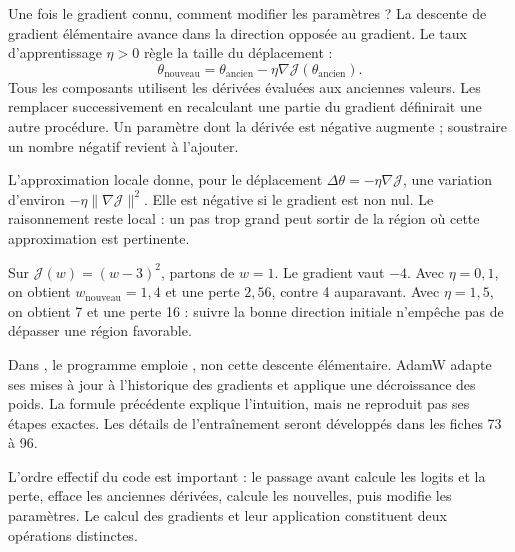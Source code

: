 

Une fois le gradient connu, comment modifier les paramètres ?
La descente de gradient élémentaire avance dans la direction
opposée au gradient. Le taux d'apprentissage \(\eta>0\)
règle la taille du déplacement :
\[
 \theta_{\mathrm{nouveau}}
 =\theta_{\mathrm{ancien}}-\eta\nabla\mathcal{J}
   (\theta_{\mathrm{ancien}}).
\]
Tous les composants utilisent les dérivées évaluées aux anciennes
valeurs. Les remplacer successivement en recalculant une partie
du gradient définirait une autre procédure.
Un paramètre dont la dérivée est négative augmente ; soustraire
un nombre négatif revient à l'ajouter.

L'approximation locale donne, pour le déplacement
\(\Delta\theta=-\eta\nabla\mathcal{J}\),
une variation d'environ
\(-\eta\|\nabla\mathcal{J}\|^2\).
Elle est négative si le gradient est non nul.
Le raisonnement reste local : un pas trop grand peut sortir
de la région où cette approximation est pertinente.

Sur \(\mathcal{J}(w)=(w-3)^2\), partons de \(w=1\).
Le gradient vaut \(-4\). Avec \(\eta=0{,}1\), on obtient
\(w_{\mathrm{nouveau}}=1{,}4\) et une perte \(2{,}56\),
contre 4 auparavant. Avec \(\eta=1{,}5\), on obtient 7
et une perte 16 : suivre la bonne direction initiale
n'empêche pas de dépasser une région favorable.

Dans , le programme emploie
, non cette descente élémentaire.
AdamW adapte ses mises à jour à l'historique des gradients
et applique une décroissance des poids. La formule précédente
explique l'intuition, mais ne reproduit pas ses étapes exactes.
Les détails de l'entraînement seront développés dans les
fiches 73 à 96.

L'ordre effectif du code est important :
le passage avant calcule les logits et la perte,
 efface
les anciennes dérivées,  calcule
les nouvelles, puis  modifie
les paramètres. Le calcul des gradients et leur application
constituent deux opérations distinctes.

